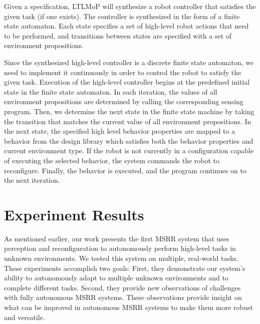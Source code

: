 \documentclass[conference]{IEEEtran}
\newcommand{\lt}{{\tt True }}
\begin{document}
Given a specification,  LTLMoP will synthesize a robot controller that satisfies the given  task (if one exists). The controller is synthesized in the form of a finite state automaton.
Each state specifies a set of high-level robot actions that need to be performed, and transitions between states are specified with a set of environment propositions.

Since the synthesized high-level controller is a discrete finite state automaton, we need to implement it continuously in order to control the robot to satisfy the given task.
Execution of the high-level controller begins at the predefined initial state in the finite state automaton. In each iteration, the values of all environment propositions are determined by calling the corresponding sensing program. Then, we determine the next state in the finite state machine by taking the transition that matches the current value of all environment propositions. 
In the next state, the specified high level behavior properties are mapped to a behavior from the design library which satisfies both the behavior properties and current environment type.
If the robot is not currently in a configuration capable of executing the selected behavior, the system commands the robot to reconfigure. Finally, the behavior is executed, and the program continues on to the next iteration. 



\section{Experiment Results}
\label{sec:experiments}
%

As mentioned earlier, our work presents the first MSRR system that uses perception and reconfiguration to autonomously perform high-level tasks in unknown environments. We tested this system on multiple, real-world tasks. These experiments accomplish two goals: First, they demonstrate our system's ability to autonomously adapt to multiple unknown environments and to complete different tasks. Second, they provide new observations of challenges with fully autonomous MSRR systems. These observations provide insight on what can be improved in autonomous MSRR systems to make them more robust and versatile.
\end{document}
